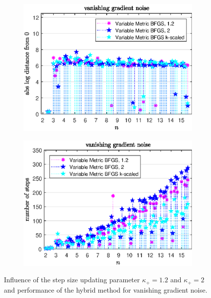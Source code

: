 \vspace{-1.5em}

\begin{figure}[H]
	\begin{subfigure}{0.49\textwidth}
		\includegraphics[width=\textwidth]{Pictures/Plots/vanishing_gradient_noise_comp.eps}%
	\end{subfigure}
	\begin{subfigure}{0.49\textwidth}
		\includegraphics[width=\textwidth]{Pictures/Plots/steps_vanishing_gradient_noise_comp.eps}%
	\end{subfigure}
	\caption{Influence of the step size updating parameter \(\kappa_+ = 1.2\) and \(\kappa_+ =2 \) and performance of the hybrid method for vanishing gradient noise.}%
	\label{fig_van_grad_noise_comp}%
\end{figure}

